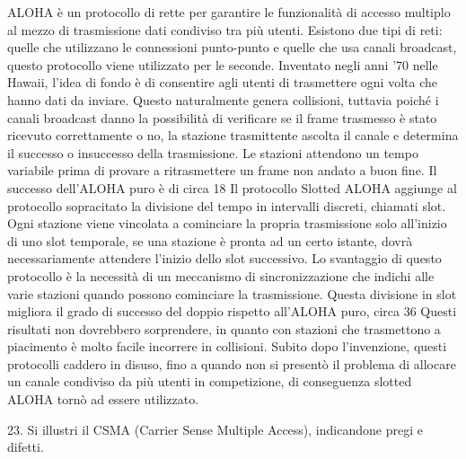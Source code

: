 ALOHA è un protocollo di rette per garantire le funzionalità di accesso multiplo al mezzo di trasmissione dati condiviso tra più utenti. Esistono due tipi di reti: quelle che utilizzano le connessioni punto-punto e quelle che usa canali broadcast, questo protocollo viene utilizzato per le seconde.
Inventato negli anni ’70 nelle Hawaii, l’idea di fondo è di consentire agli utenti di trasmettere ogni volta che hanno dati da inviare. Questo naturalmente genera collisioni, tuttavia poiché i canali broadcast danno la possibilità di verificare se il frame trasmesso è stato ricevuto correttamente o no, la stazione trasmittente ascolta il canale e determina il successo o insuccesso della trasmissione.
Le stazioni attendono un tempo variabile prima di provare a ritrasmettere un frame non andato a buon fine.
Il successo dell’ALOHA puro è di circa 18%
Il protocollo Slotted ALOHA aggiunge al protocollo sopracitato la divisione del tempo in intervalli discreti, chiamati slot. Ogni stazione viene vincolata a cominciare la propria trasmissione solo all’inizio di uno slot temporale, se una stazione è pronta ad un certo istante, dovrà necessariamente attendere l’inizio dello slot successivo.
Lo svantaggio di questo protocollo è la necessità di un meccanismo di sincronizzazione che indichi alle varie stazioni quando possono cominciare la trasmissione.
Questa divisione in slot migliora il grado di successo del doppio rispetto all’ALOHA puro, circa 36%
Questi risultati non dovrebbero sorprendere, in quanto con stazioni che trasmettono a piacimento è molto facile incorrere in collisioni.
Subito dopo l’invenzione, questi protocolli caddero in disuso, fino a quando non si presentò il problema di allocare un canale condiviso da più utenti in competizione, di conseguenza slotted ALOHA tornò ad essere utilizzato.
  


23.	Si illustri il CSMA (Carrier Sense Multiple Access), indicandone pregi e difetti.

